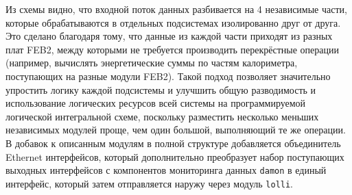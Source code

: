 Из схемы видно, что входной поток данных разбивается на 4 независимые части, которые обрабатываются в отдельных подсистемах изолированно друг от друга. Это сделано благодаря тому, что данные из каждой части приходят из разных плат FEB2, между которыми не требуется производить перекрёстные операции (например, вычислять энергетические суммы по частям калориметра, поступающих на разные модули FEB2). Такой подход позволяет значительно упростить логику каждой подсистемы и улучшить общую разводимость и использование логических ресурсов всей системы на программируемой логической интегральной схеме, поскольку разместить несколько меньших независимых модулей проще, чем один большой, выполняющий те же операции. В добавок к описанным модулям в полной структуре добавляется объединитель Ethernet интерфейсов, который дополнительно преобразует набор поступающих выходных интерфейсов с компонентов мониторинга данных \texttt{damon} в единый интерфейс, который затем отправляется наружу через модуль \texttt{lolli}.\par
